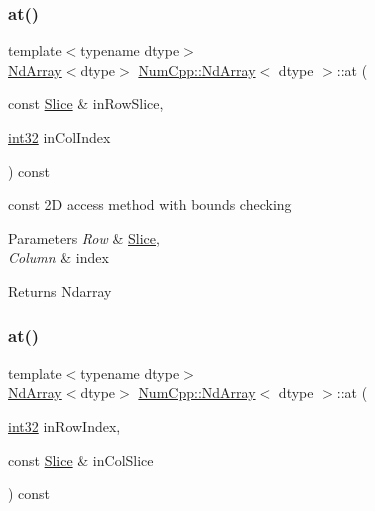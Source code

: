 \subsubsection{\texorpdfstring{at()}{at()}\hspace{0.1cm}{\footnotesize\ttfamily [7/8]}}
{\footnotesize\ttfamily template$<$typename dtype$>$ \\
\mbox{\hyperlink{class_num_cpp_1_1_nd_array}{Nd\+Array}}$<$dtype$>$ \mbox{\hyperlink{class_num_cpp_1_1_nd_array}{Num\+Cpp\+::\+Nd\+Array}}$<$ dtype $>$\+::at (\begin{DoxyParamCaption}\item[{const \mbox{\hyperlink{class_num_cpp_1_1_slice}{Slice}} \&}]{in\+Row\+Slice,  }\item[{\mbox{\hyperlink{namespace_num_cpp_acf3eb1592f8b248ff0a236634864633c}{int32}}}]{in\+Col\+Index }\end{DoxyParamCaption}) const\hspace{0.3cm}{\ttfamily [inline]}}

const 2D access method with bounds checking


\begin{DoxyParams}{Parameters}
{\em Row} & \mbox{\hyperlink{class_num_cpp_1_1_slice}{Slice}}, \\
\hline
{\em Column} & index \\
\hline
\end{DoxyParams}
\begin{DoxyReturn}{Returns}
Ndarray 
\end{DoxyReturn}
\mbox{\label{class_num_cpp_1_1_nd_array_a2404eb9216550459e63a6afa03874544}} 
\subsubsection{\texorpdfstring{at()}{at()}\hspace{0.1cm}{\footnotesize\ttfamily [8/8]}}
{\footnotesize\ttfamily template$<$typename dtype$>$ \\
\mbox{\hyperlink{class_num_cpp_1_1_nd_array}{Nd\+Array}}$<$dtype$>$ \mbox{\hyperlink{class_num_cpp_1_1_nd_array}{Num\+Cpp\+::\+Nd\+Array}}$<$ dtype $>$\+::at (\begin{DoxyParamCaption}\item[{\mbox{\hyperlink{namespace_num_cpp_acf3eb1592f8b248ff0a236634864633c}{int32}}}]{in\+Row\+Index,  }\item[{const \mbox{\hyperlink{class_num_cpp_1_1_slice}{Slice}} \&}]{in\+Col\+Slice }\end{DoxyParamCaption}) const\hspace{0.3cm}{\ttfamily [inline]}}

